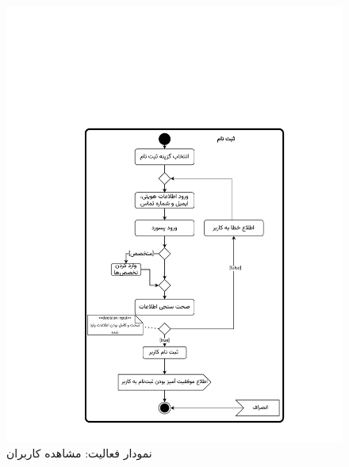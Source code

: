 \begin{figure}
	\centering
	\includegraphics[scale=0.8, page=5]{figs/OOD-activity1-10.pdf}
	\caption{نمودار فعالیت: مشاهده کاربران}
\end{figure}
\FloatBarrier
\newpage

